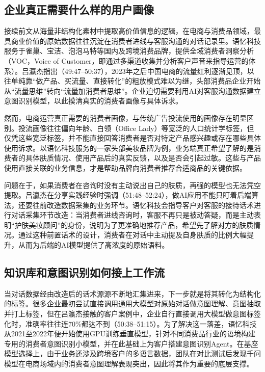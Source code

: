 \documentclass[UTF8,a4paper,11pt,fontset=fandol]{ctexart}
\begin{document}
\subsection{企业真正需要什么样的用户画像}
接续前文从海量非结构化素材中提取高价值信息的逻辑，在电商与消费品领域，最具商业价值的原始数据往往沉淀在消费者进线与客服沟通的对话记录里。语忆科技服务于雀巢、宝洁、泡泡马特等国内及跨境消费品牌，提供全域消费者洞察分析（VOC，Voice of Customer，即通过多渠道收集并分析客户声音来指导运营的体系）。吕瀛杰指出（49:47–50:37），2023年之后中国电商的流量红利逐渐见顶，以往单纯靠“做产品、买流量、直接转化”的粗放模式难以为继，头部消费品企业开始从“流量思维”转向“流量加消费者思维”。企业迫切需要利用AI对客服沟通数据建立意图识别模型，以此摸清真实的消费者画像与具体诉求。

然而，电商运营真正需要的消费者画像，与传统广告投流使用的画像存在明显区别。投流画像往往偏向年龄、白领（Office Lady）等宽泛的人口统计学标签，但仅凭这些宽泛标签，并不能直接回答消费者是否对特定产品感兴趣或存在哪些具体使用诉求。以语忆科技服务的一家头部美妆品牌为例，业务端真正希望了解的是消费者的具体肤质情况、使用产品后的真实反馈，以及是否会引起过敏。这些与产品使用直接关联的业务信息，才是帮助品牌向消费者推荐合适商品的关键依据。

问题在于，如果消费者在咨询时没有主动说出自己的肤质，再强的模型也无法凭空提取。吕瀛杰在分享实践经验时强调（51:48–52:24），做AI应用不能只盯着后端算法，还要往前改造数据采集的业务环节。语忆科技会指导客户对客服的接待话术进行对话采集环节改造：当消费者进线咨询时，客服不再只是被动答疑，而是主动表明“护肤美妆顾问”的身份，说明为了更准确地推荐产品，希望先了解对方的肤质情况。通过这种前置话术的设计，消费者在对话中主动提及自身肤质的比例大幅提升，从而为后端的AI模型提供了高浓度的原始语料。

\subsection{知识库和意图识别如何接上工作流}
当对话数据经由改造后的话术源源不断地汇集进来，下一步就是将其转化为结构化的标签。很多企业最初尝试直接调用通用大模型对原始对话做意图理解、意图抽取并打上标签，但在吕瀛杰接触的客户案例中，企业自行直接调用大模型做意图标签化时，准确率往往连70\%都达不到（50:38–51:15）。为了解决这一落差，语忆科技从2021至2022年便开始使用GPU训练垂直模型，针对不同消费品行业的语境构建专用的消费者意图识别小模型，并在此基础上为客户搭建意图识别Agent。在基座模型选择上，由于业务还涉及跨境客户的多语言数据，团队在对比测试后发现千问模型在电商场域内的消费者意图理解表现突出，因此将其作为重要的底层支撑。
\end{document}
